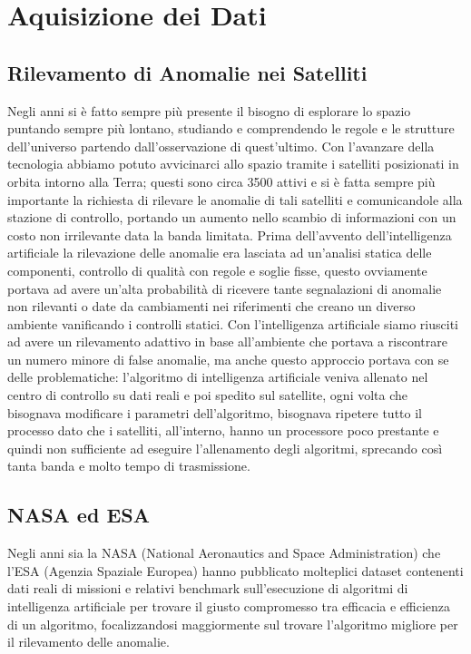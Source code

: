 \chapter{Aquisizione dei Dati}
\section{Rilevamento di Anomalie nei Satelliti}
Negli anni si è fatto sempre più presente il bisogno di esplorare lo spazio puntando sempre più lontano, studiando e comprendendo le regole e le strutture dell'universo partendo dall'osservazione di quest'ultimo. Con l'avanzare della tecnologia abbiamo potuto avvicinarci allo spazio tramite i satelliti posizionati in orbita intorno alla Terra; questi sono circa 3500 attivi e si è fatta sempre più importante la richiesta di rilevare le anomalie di tali satelliti e comunicandole alla stazione di controllo, portando un aumento nello scambio di informazioni con un costo non irrilevante data la banda limitata.
Prima dell'avvento dell'intelligenza artificiale la rilevazione delle anomalie era lasciata ad un'analisi statica delle componenti, controllo di qualità con regole e soglie fisse, questo ovviamente portava ad avere un'alta probabilità di ricevere tante segnalazioni di anomalie non rilevanti o date da cambiamenti nei riferimenti che creano un diverso ambiente vanificando i controlli statici.
Con l'intelligenza artificiale siamo riusciti ad avere un rilevamento adattivo in base all'ambiente che portava a riscontrare un numero minore di false anomalie, ma anche questo approccio portava con se delle problematiche: l'algoritmo di intelligenza artificiale veniva allenato nel centro di controllo su dati reali e poi spedito sul satellite, ogni volta che bisognava modificare i parametri dell'algoritmo, bisognava ripetere tutto il processo dato che i satelliti, all'interno, hanno un processore poco prestante e quindi non sufficiente ad eseguire l'allenamento degli algoritmi, sprecando così tanta banda e molto tempo di trasmissione.

\section{NASA ed ESA}
Negli anni sia la NASA (National Aeronautics and Space Administration) che l'ESA (Agenzia Spaziale Europea) hanno pubblicato molteplici dataset contenenti dati reali di missioni e relativi benchmark sull'esecuzione di algoritmi di intelligenza artificiale per trovare il giusto compromesso tra efficacia e efficienza di un algoritmo, focalizzandosi maggiormente sul trovare l'algoritmo migliore per il rilevamento delle anomalie.


